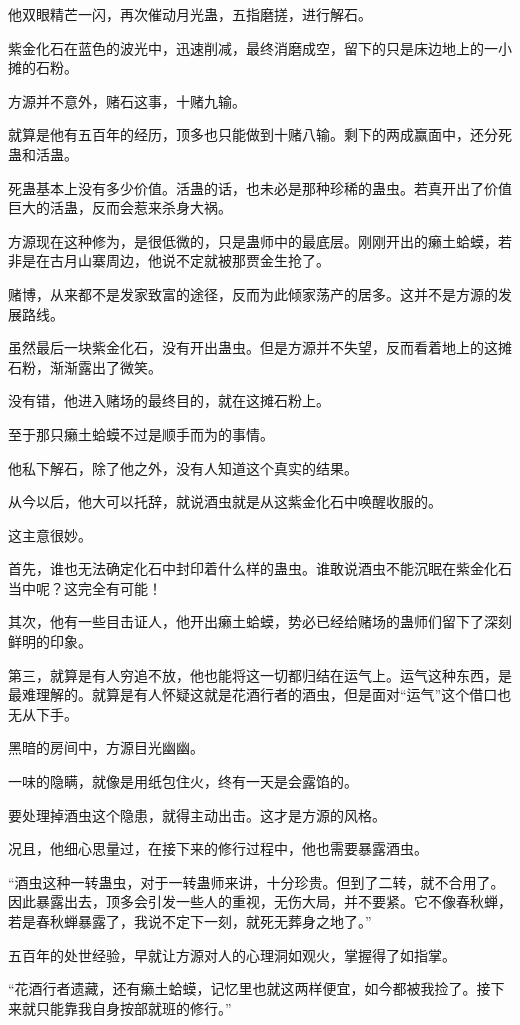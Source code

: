 \begin{this_body}
他双眼精芒一闪，再次催动月光蛊，五指磨搓，进行解石。

紫金化石在蓝色的波光中，迅速削减，最终消磨成空，留下的只是床边地上的一小摊的石粉。

方源并不意外，赌石这事，十赌九输。

就算是他有五百年的经历，顶多也只能做到十赌八输。剩下的两成赢面中，还分死蛊和活蛊。

死蛊基本上没有多少价值。活蛊的话，也未必是那种珍稀的蛊虫。若真开出了价值巨大的活蛊，反而会惹来杀身大祸。

方源现在这种修为，是很低微的，只是蛊师中的最底层。刚刚开出的癞土蛤蟆，若非是在古月山寨周边，他说不定就被那贾金生抢了。

赌博，从来都不是发家致富的途径，反而为此倾家荡产的居多。这并不是方源的发展路线。

虽然最后一块紫金化石，没有开出蛊虫。但是方源并不失望，反而看着地上的这摊石粉，渐渐露出了微笑。

没有错，他进入赌场的最终目的，就在这摊石粉上。

至于那只癞土蛤蟆不过是顺手而为的事情。

他私下解石，除了他之外，没有人知道这个真实的结果。

从今以后，他大可以托辞，就说酒虫就是从这紫金化石中唤醒收服的。

这主意很妙。

首先，谁也无法确定化石中封印着什么样的蛊虫。谁敢说酒虫不能沉眠在紫金化石当中呢？这完全有可能！

其次，他有一些目击证人，他开出癞土蛤蟆，势必已经给赌场的蛊师们留下了深刻鲜明的印象。

第三，就算是有人穷追不放，他也能将这一切都归结在运气上。运气这种东西，是最难理解的。就算是有人怀疑这就是花酒行者的酒虫，但是面对“运气”这个借口也无从下手。

黑暗的房间中，方源目光幽幽。

一味的隐瞒，就像是用纸包住火，终有一天是会露馅的。

要处理掉酒虫这个隐患，就得主动出击。这才是方源的风格。

况且，他细心思量过，在接下来的修行过程中，他也需要暴露酒虫。

“酒虫这种一转蛊虫，对于一转蛊师来讲，十分珍贵。但到了二转，就不合用了。因此暴露出去，顶多会引发一些人的重视，无伤大局，并不要紧。它不像春秋蝉，若是春秋蝉暴露了，我说不定下一刻，就死无葬身之地了。”

五百年的处世经验，早就让方源对人的心理洞如观火，掌握得了如指掌。

“花酒行者遗藏，还有癞土蛤蟆，记忆里也就这两样便宜，如今都被我捡了。接下来就只能靠我自身按部就班的修行。”


\end{this_body}

